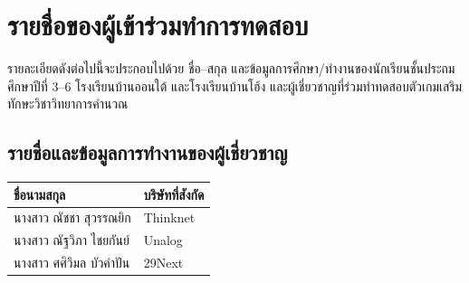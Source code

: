 \chapter{รายชื่อของผู้เข้าร่วมทำการทดสอบ}
รายละเอียดดังต่อไปนี้จะประกอบไปด้วย ชื่อ--สกุล และข้อมูลการศึกษา/ทำงานของนักเรียนชั้นประถมศึกษาปีที่ 3--6 โรงเรียนบ้านออนใต้ และโรงเรียนบ้านโฮ้ง และผู้เชี่ยวชาญที่ร่วมทำทดสอบตัวเกมเสริมทักษะวิชาวิทยาการคำนวณ
\section{รายชื่อและข้อมูลการทำงานของผู้เชี่ยวชาญ}
\begin{center}
    \begin{tabular}{ |p{5cm}|p{5cm}| }
        \hline
        ชื่อนามสกุล & บริษัทที่สังกัด\\
        \hline
        นางสาว ณัชชา สุวรรณยิก & Thinknet\\
        \hline
        นางสาว ณัฐวิภา ไชยกันย์ & Unalog\\
        \hline
        นางสาว ศศิวิมล บัวคำปัน & 29Next\\
        \hline
    \end{tabular}
\end{center}
